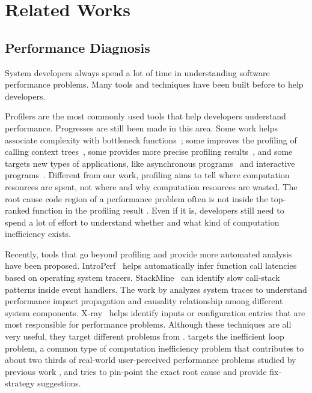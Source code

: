 \section{Related Works}
\label{sec:related}

\subsection{Performance Diagnosis}
System developers always spend a lot of time in understanding software 
performance problems. Many tools and techniques have been built before to
help developers. 

Profilers are the most commonly used tools that help developers understand
performance.
Progresses are still been made in this area.
Some work helps associate complexity with bottleneck functions~\cite{Zaparanuks:2012:AP:2254064.2254074,Coppa:2012:IP:2254064.2254076};
some improves the profiling of calling context trees~\cite{D'Elia:2011:MHC:1993498.1993559}, 
some provides more precise profiling results~\cite{Mytkowicz:2010:EAJ:1806596.1806618}, and some targets new types of applications, 
like asynchronous programs~\cite{Ravindranath:2012:AMA:2387880.2387891} and 
interactive programs~\cite{Jovic:2011:CMY:2048066.2048081}.
Different from our work, profiling aims to tell where 
computation resources are spent, 
not where and why computation resources are wasted. 
The root cause code region of a performance problem often is not inside
the top-ranked function in the profiling result \cite{SongOOPSLA2014}.
Even if it is, developers still need to spend a lot of effort to understand
whether and what kind of computation inefficiency exists.

Recently, tools that go beyond profiling and provide more automated analysis
have been proposed.
IntroPerf~\cite{IntroPerf} helps automatically 
infer function call latencies based on
operating system tracers. StackMine~\cite{Han:2012:PDL:2337223.2337241} can
identify slow call-stack patterns inside event handlers. The work by
\citet{TaoAsplos2014} analyzes system traces to understand 
performance impact propagation and 
causality relationship among different system components. 
X-ray~\cite{Attariyan:2012:XAR:2387880.2387910} helps identify inputs
or configuration entries that are most responsible for performance problems.
Although these techniques are all very useful, 
they target different problems from \Tool. \Tool targets 
the inefficient loop problem, a common type of 
computation inefficiency problem that contributes to
about two thirds of real-world user-perceived performance problems studied
by previous work \cite{SongOOPSLA2014}, and tries to pin-point the exact
root cause and provide fix-strategy suggestions.

